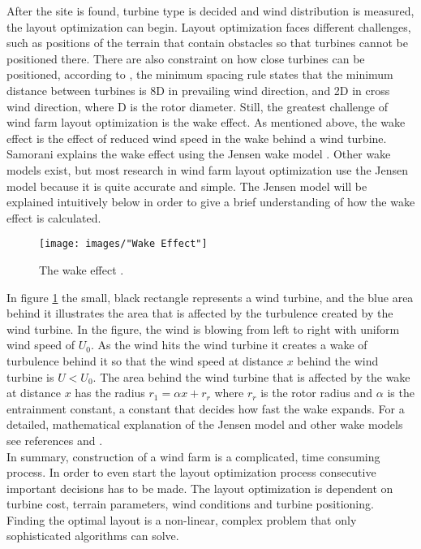 \noindent After the site is found, turbine type is decided and wind distribution is measured, the layout optimization can begin. Layout optimization faces different challenges, such as positions of the terrain that contain obstacles so that turbines cannot be positioned there. There are also constraint on how close turbines can be positioned, according to \cite{Sisbot}, the minimum spacing rule states that the minimum distance between turbines is 8D in prevailing wind direction, and 2D in cross wind direction, where D is the rotor diameter. Still, the greatest challenge of wind farm layout optimization is the wake effect. As mentioned above, the wake effect is the effect of reduced wind speed in the wake behind a wind turbine. Samorani explains the wake effect using the Jensen wake model \citep{Jensen}. Other wake models exist, but most research in wind farm layout optimization use the Jensen model because it is quite accurate and simple. The Jensen model will be explained intuitively below in order to give a brief understanding of how the wake effect is calculated. \\

\begin{figure}[h!]
\begin{center}
\texttt{[image: images/"Wake Effect"]}
\caption{The wake effect \citep{Samorani}.}
\label{Wake effect}
\end{center}
\end{figure}

\noindent In figure \ref{Wake effect} the small, black rectangle represents a wind turbine, and the blue area behind it illustrates the area that is affected by the turbulence created by the wind turbine. In the figure, the wind is blowing from left to right with uniform wind speed of $U_0$. As the wind hits the wind turbine it creates a wake of turbulence behind it so that the wind speed at distance $x$ behind the wind turbine is $U < U_0$. The area behind the wind turbine that is affected by the wake at distance $x$ has the radius $r_1 = \alpha x + r_r$ where $r_r$ is the rotor radius and $\alpha$ is the entrainment constant, a constant that decides how fast the wake expands. For a detailed, mathematical explanation of the Jensen model and other wake models see references \citep{Jensen} and \citep{Liang}.\\

\noindent In summary, construction of a wind farm is a complicated, time consuming process. In order to even start the layout optimization process consecutive important decisions has to be made. The layout optimization is dependent on turbine cost, terrain parameters, wind conditions and turbine positioning. Finding the optimal layout is a non-linear, complex problem that only sophisticated algorithms can solve.


